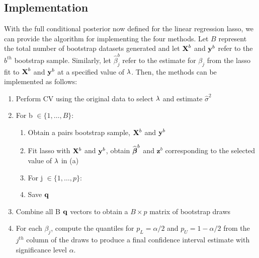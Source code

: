 \subsection{Implementation}
\label{Sec:implementation}


With the full conditional posterior now defined for the linear regression lasso, we can provide the algorithm for implementing the four methods. Let $B$ represent the total number of bootstrap datasets generated and let $\boldsymbol{\mathbf{X}}^b$ and $\boldsymbol{\mathbf{y}}^{b}$ refer to the $b^{th}$ bootstrap sample. Similarly, let $\hat{\beta}^b_j$ refer to the estimate for $\beta_j$ from the lasso fit to $\boldsymbol{\mathbf{X}}^b$ and $\boldsymbol{\mathbf{y}}^b$ at a specified value of $\lambda$. Then, the methods can be implemented as follows:

\begin{enumerate}
\item Perform CV using the original data to select $\lambda$ and estimate $\hat{\sigma}^2$
\item For b $\in \lbrace 1, \ldots, B \rbrace$:
\begin{enumerate}
\item Obtain a pairs bootstrap sample, $\mathbf{X}^b$ and $\mathbf{y}^b$
\item Fit lasso with $\mathbf{X}^b$ and $\mathbf{y}^b$, obtain $\widehat{\boldsymbol{\beta}}^b$ and $\boldsymbol{z}^b$ corresponding to the selected value of $\lambda$ in (a)
\item For j $\in \lbrace 1, \ldots, p \rbrace$:
	\begin{algorithmic}
    \EndCase
    \EndCase
    \EndCase
    \EndCase
	\EndSwitch 
	\end{algorithmic}
\item Save $\mathbf{q}$
\end{enumerate}
\item Combine all B $\mathbf{q}$ vectors to obtain a $B \times p$ matrix of bootstrap draws 
\item For each $\beta_j$, compute the quantiles for $p_L = \alpha/2$ and $p_U = 1 - \alpha/2$ from the $j^{th}$ column of the draws to produce a final confidence interval estimate with significance level $\alpha$.
\end{enumerate}

